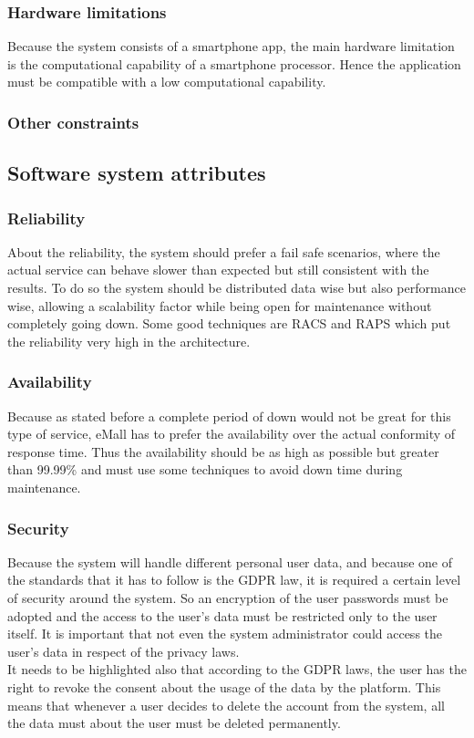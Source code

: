 \subsubsection{Hardware limitations}
Because the system consists of a smartphone app, the main hardware limitation is the computational capability of a smartphone processor. Hence the
application must be compatible with a low computational capability.

\subsubsection{Other constraints}

\subsection{Software system attributes}
\subsubsection{Reliability}
About the reliability, the system should prefer a fail safe scenarios, where the actual service can behave slower than expected but still consistent with the results.
To do so the system should be distributed data wise but also performance wise, allowing a scalability factor while being open for maintenance without completely going down.
Some good techniques are \ac{RACS} and \ac{RAPS} which put the reliability very high in the architecture.
\subsubsection{Availability}
Because as stated before a complete period of down would not be great for this type of service, eMall has to prefer the availability over the actual conformity of response time.
Thus the availability should be as high as possible but greater than 99.99\% and must use some techniques to avoid down time during maintenance.
\subsubsection{Security}
Because the system will handle different personal user data, and because one of the standards that it has to follow is the \ac{GDPR} law, it is required a certain level
of security around the system. So an encryption of the user passwords must be adopted and the access to the user's data must be restricted only to the user itself.
It is important that not even the system administrator could access the user's data in respect of the privacy laws.\\
It needs to be highlighted also that according to the \ac{GDPR} laws, the user has the right to revoke the consent about the usage of the data by the platform. This means that
whenever a user decides to delete the account from the system, all the data must about the user must be deleted permanently.
